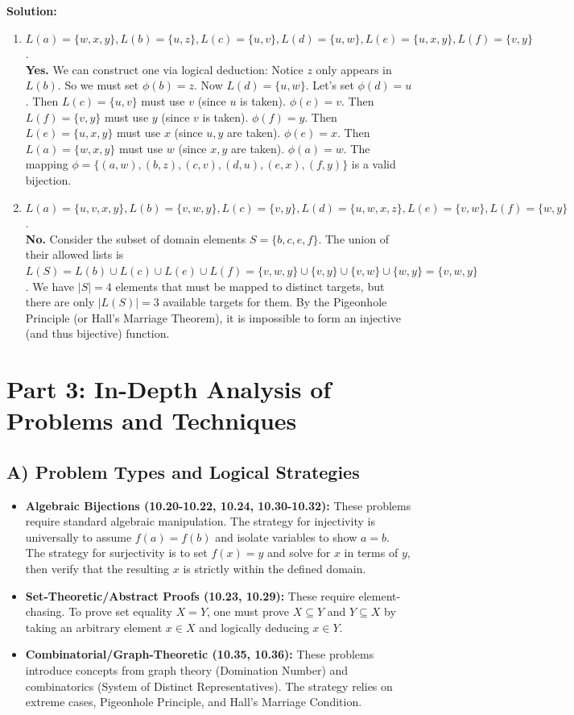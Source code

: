 \documentclass[11pt, a4paper]{article}
\theoremstyle{definition}
\theoremstyle{remark}
\begin{document}
\textbf{Solution:}
\begin{enumerate}[label=(\alph*)]
    \item $L(a)=\{w,x,y\}, L(b)=\{u,z\}, L(c)=\{u,v\}, L(d)=\{u,w\}, L(e)=\{u,x,y\}, L(f)=\{v,y\}$. \\
    \textbf{Yes.} We can construct one via logical deduction:
    Notice $z$ only appears in $L(b)$. So we must set $\phi(b) = z$. 
    Now $L(d) = \{u,w\}$. Let's set $\phi(d) = u$. 
    Then $L(c) = \{u,v\}$ must use $v$ (since $u$ is taken). $\phi(c) = v$. 
    Then $L(f) = \{v,y\}$ must use $y$ (since $v$ is taken). $\phi(f) = y$. 
    Then $L(e) = \{u,x,y\}$ must use $x$ (since $u, y$ are taken). $\phi(e) = x$. 
    Then $L(a) = \{w,x,y\}$ must use $w$ (since $x, y$ are taken). $\phi(a) = w$. 
    The mapping $\phi = \{(a,w), (b,z), (c,v), (d,u), (e,x), (f,y)\}$ is a valid bijection.
    
    \item $L(a)=\{u,v,x,y\}, L(b)=\{v,w,y\}, L(c)=\{v,y\}, L(d)=\{u,w,x,z\}, L(e)=\{v,w\}, L(f)=\{w,y\}$. \\
    \textbf{No.} Consider the subset of domain elements $S = \{b, c, e, f\}$. 
    The union of their allowed lists is $L(S) = L(b) \cup L(c) \cup L(e) \cup L(f) = \{v,w,y\} \cup \{v,y\} \cup \{v,w\} \cup \{w,y\} = \{v, w, y\}$. 
    We have $|S| = 4$ elements that must be mapped to distinct targets, but there are only $|L(S)| = 3$ available targets for them. By the Pigeonhole Principle (or Hall's Marriage Theorem), it is impossible to form an injective (and thus bijective) function.
\end{enumerate}

\newpage
\section{Part 3: In-Depth Analysis of Problems and Techniques}

\subsection{A) Problem Types and Logical Strategies}
\begin{itemize}
    \item \textbf{Algebraic Bijections (10.20-10.22, 10.24, 10.30-10.32):} These problems require standard algebraic manipulation. The strategy for injectivity is universally to assume $f(a) = f(b)$ and isolate variables to show $a=b$. The strategy for surjectivity is to set $f(x) = y$ and solve for $x$ in terms of $y$, then verify that the resulting $x$ is strictly within the defined domain.
    \item \textbf{Set-Theoretic/Abstract Proofs (10.23, 10.29):} These require element-chasing. To prove set equality $X = Y$, one must prove $X \subseteq Y$ and $Y \subseteq X$ by taking an arbitrary element $x \in X$ and logically deducing $x \in Y$.
    \item \textbf{Combinatorial/Graph-Theoretic (10.35, 10.36):} These problems introduce concepts from graph theory (Domination Number) and combinatorics (System of Distinct Representatives). The strategy relies on extreme cases, Pigeonhole Principle, and Hall's Marriage Condition.
\end{itemize}
\end{document}
